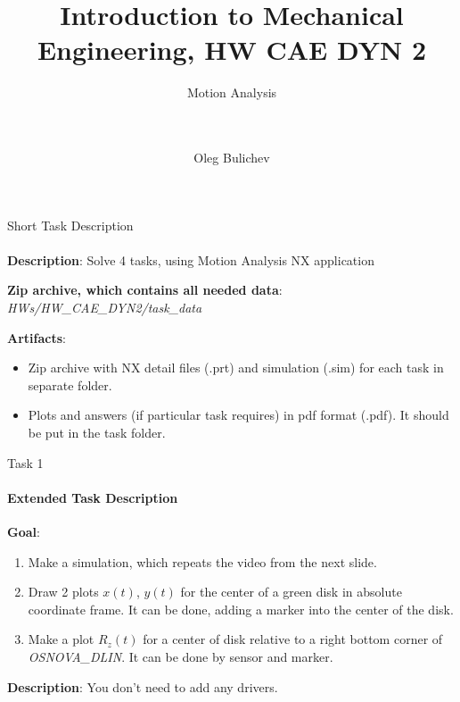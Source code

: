 \documentclass[aspectratio=169]{beamer}
\title[IME]{Introduction to Mechanical Engineering, HW CAE DYN 2} %
\subtitle{Motion Analysis
\\ \  \\ \ 
         } %
\author{Oleg Bulichev}
\newcommand{\fbckg}[1]{\usebackgroundtemplate{\texttt{[image: \#1]}}}%
\begin{document}
\setlength{\abovedisplayskip}{0pt}
\setlength{\belowdisplayskip}{0pt}
\setlength{\abovedisplayshortskip}{0pt}
\setlength{\belowdisplayshortskip}{0pt}

\fbckg{fibeamer/figs/title_page.png}

\fbckg{fibeamer/figs/common.png}

\note{\scriptsize \begin{itemize}
        \item \
    \end{itemize}}

\note{
    \
}

\begin{frame}[t]{Short Task Description}
    \framesubtitle{}
    \textbf{Description}: Solve 4 tasks, using Motion Analysis NX application

    \textbf{Zip archive, which contains all needed data}: \textit{HWs/HW\_CAE\_DYN2/task\_data}

    \textbf{Artifacts}:
    \begin{itemize}
        \item Zip archive with NX detail files (.prt) and simulation (.sim) for each task in separate folder.
        \item Plots and answers (if particular task requires) in pdf format (.pdf). It should be put in the task folder.
    \end{itemize}
\end{frame}

\begin{frame}[t]{Task 1}
    \framesubtitle{Extended Task Description}
    \textbf{Goal}: \begin{enumerate}
        \item Make a simulation, which repeats the video from the next slide.
        \item Draw 2 plots $x(t)$, $y(t)$ for the center of a green disk in absolute coordinate frame. It can be done, adding a marker into the center of the disk.
        \item Make a plot $R_z(t)$ for a center of disk relative to a right bottom corner of \textit{OSNOVA\_DLIN}. It can be done by sensor and marker.
    \end{enumerate}
    \smallskip

    \textbf{Description}: You don't need to add any drivers. 
\end{frame}
\end{document}
